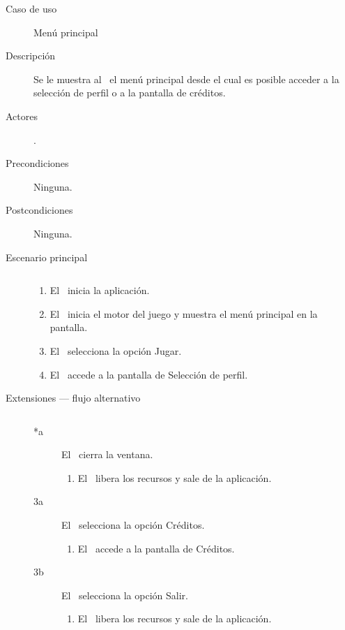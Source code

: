 \begin{description}
    \item [Caso de uso] Menú principal
    \item [Descripción] Se le muestra al \jugador\ el menú principal desde
    el cual es posible acceder a la selección de perfil o a la pantalla de
    créditos.
    \item [Actores] \jugador.
    \item [Precondiciones] Ninguna.
    \item [Postcondiciones] Ninguna.
    \item [Escenario principal] $\quad$
        \begin{enumerate}
            \item El \jugador\ inicia la aplicación.
            \item El \sistema\ inicia el motor del juego y muestra el menú
            principal en la pantalla.
            \item El \jugador\ selecciona la opción Jugar.
            \item El \sistema\ accede a la pantalla de Selección de perfil.
        \end{enumerate}
    \item[Extensiones --- flujo alternativo] $\quad$
        \begin{description}
            \item [*a] El \jugador\ cierra la ventana.
                \begin{enumerate}
                    \item El \sistema\ libera los recursos y sale de la aplicación.
                \end{enumerate}
            \item [3a] El \jugador\ selecciona la opción Créditos.
                \begin{enumerate}
                    \item El \sistema\ accede a la pantalla de Créditos.
                \end{enumerate}
            \item [3b] El \jugador\ selecciona la opción Salir.
                \begin{enumerate}
                    \item El \sistema\ libera los recursos y sale de la aplicación.\\
                \end{enumerate}
        \end{description}
    
\end{description}


